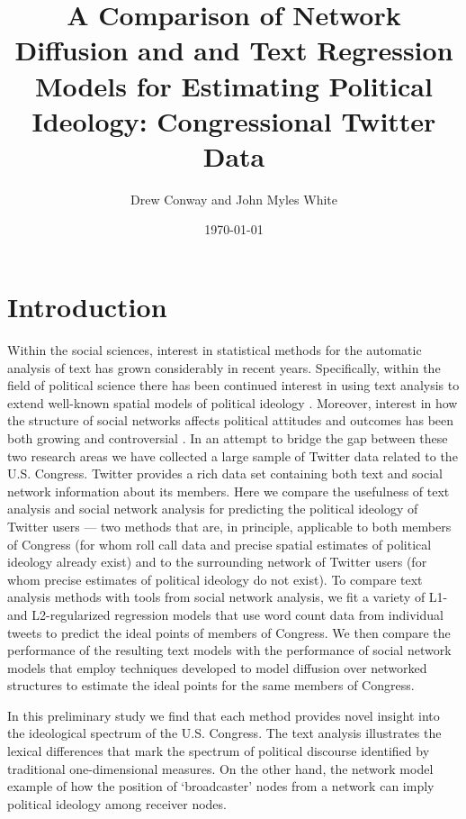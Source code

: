 \documentclass[10pt]{article}
\title{A Comparison of Network Diffusion and and Text Regression Models for Estimating Political Ideology: Congressional Twitter Data}
\author{Drew Conway and John Myles White}
\date{\today}
\begin{document}
\maketitle

\section{Introduction}
Within the social sciences, interest in statistical methods for the automatic analysis of text has grown considerably in recent years.  Specifically, within the field of political science there has been continued interest in using text analysis to extend well-known spatial models of political ideology \citep{Grimmer_2011, Monroe_2008, Laver_2003}.  Moreover, interest in how the structure of social networks affects political attitudes and outcomes has been both growing \citep{Siegel_2009, Burton_2009} and controversial \citep{Fowler_2010, Lyons_2010}.  In an attempt to bridge the gap between these two research areas we have collected a large sample of Twitter data related to the U.S. Congress. Twitter provides a rich data set containing both text and social network information about its members. Here we compare the usefulness of text analysis and social network analysis for predicting the political ideology of Twitter users --- two methods that are, in principle, applicable to both members of Congress (for whom roll call data and precise spatial estimates of political ideology already exist) and to the surrounding network of Twitter users (for whom precise estimates of political ideology do not exist). To compare text analysis methods with tools from social network analysis, we fit a variety of L1- and L2-regularized regression models that use word count data from individual tweets to predict the ideal points of members of Congress. We then compare the performance of the resulting text models with the performance of social network models that employ techniques developed to model diffusion over networked structures to estimate the ideal points for the same members of Congress.

In this preliminary study we find that each method provides novel insight into the ideological spectrum of the U.S. Congress.  The text analysis illustrates the lexical differences that mark the spectrum of political discourse identified by traditional one-dimensional measures. On the other hand, the network model example of how the position of  `broadcaster' nodes from a network can imply political ideology among receiver nodes.
\end{document}
